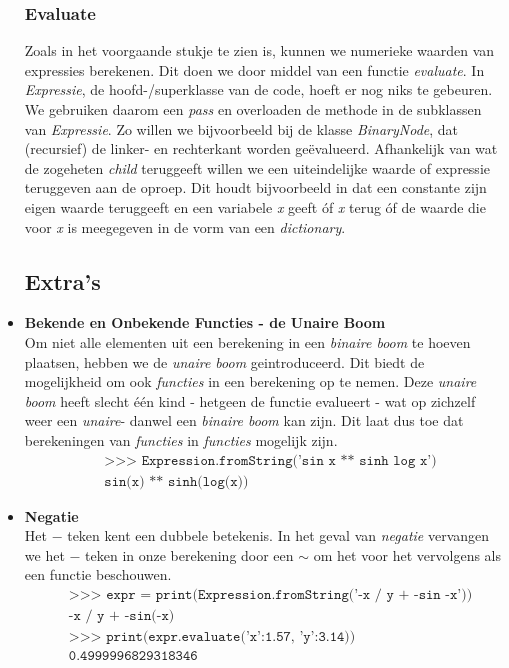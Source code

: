 \documentclass[12pt]{article}
\begin{document}
\begin{itemize}
\subsubsection*{Evaluate}
Zoals in het voorgaande stukje te zien is, kunnen we numerieke waarden van expressies berekenen. Dit doen we door middel van een functie \textit{evaluate}. In \textit{Expressie}, de hoofd-/superklasse van de code, hoeft er nog niks te gebeuren. We gebruiken daarom een \textit{pass} en overloaden de methode in de subklassen van \textit{Expressie}. Zo willen we bijvoorbeeld bij de klasse \textit{BinaryNode}, dat (recursief) de linker- en rechterkant worden ge\"{e}valueerd. Afhankelijk van wat de zogeheten \textit{child} teruggeeft willen we een uiteindelijke waarde of expressie teruggeven aan de oproep. Dit houdt bijvoorbeeld in dat een constante zijn eigen waarde teruggeeft en een variabele \textit{x} geeft \'{o}f \textit{x} terug \'{o}f de waarde die voor \textit{x} is meegegeven in de vorm van een \textit{dictionary}.


\newpage
\subsection{Extra's}

\item \textbf{Bekende en Onbekende Functies - de Unaire Boom} \\
Om niet alle elementen uit een berekening in een \textit{binaire boom} te hoeven plaatsen, hebben we de \textit{unaire boom} geintroduceerd. Dit biedt de mogelijkheid om ook \textit{functies} in een berekening op te nemen. Deze \textit{unaire boom} heeft slecht \'e\'en kind - hetgeen de functie evalueert - wat op zichzelf weer een \textit{unaire}- danwel een \textit{binaire boom} kan zijn. Dit laat dus toe dat berekeningen van \textit{functies} in \textit{functies} mogelijk zijn.
\begin{align*}
&\texttt{>>> Expression.fromString('sin x ** sinh log x')}\\
&\texttt{sin(x) ** sinh(log(x))}
\end{align*}

\item \textbf{Negatie} \\
Het $-$ teken kent een dubbele betekenis. In het geval van \textit{negatie} vervangen we het $-$ teken in onze berekening door een $\sim$ om het voor het vervolgens als een functie beschouwen. 
\begin{align*}
&\texttt{>>> expr =  print(Expression.fromString('-x / y + -sin -x'))}\\
&\texttt{-x / y + -sin(-x)}\\
&\texttt{>>> print(expr.evaluate({'x':1.57, 'y':3.14}))}\\
&\texttt{0.4999996829318346}
\end{align*}


\end{itemize}
\end{document}
